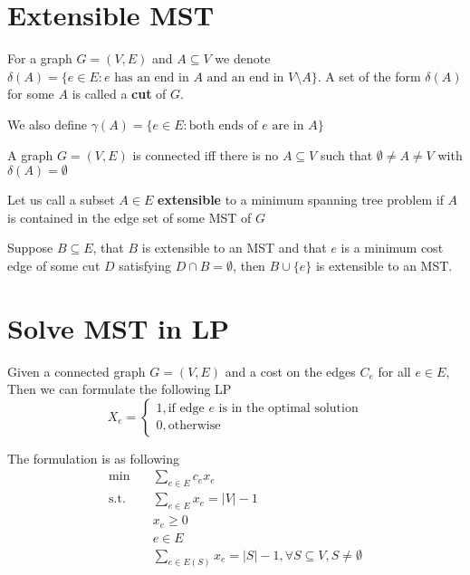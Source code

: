 		\section{Extensible MST}
			\begin{definition}[cut]
				For a graph $G=(V, E)$ and $A \subseteq V$ we denote $\delta(A) = \{e \in E :\text{$e$ has an end in $A$ and an end in $V\setminus A$}\}$. A set of the form $\delta(A)$ for some $A$ is called a \textbf{cut} of $G$.
			\end{definition}

			\begin{definition}
				We also define $\gamma(A) = \{e\in E: \text{both ends of $e$ are in $A$}\}$				
			\end{definition}

			\begin{theorem}
				A graph $G=(V, E)$ is connected iff there is no $A\subseteq V$ such that $\emptyset \ne A \ne V$ with $\delta(A) = \emptyset$
			\end{theorem}

			\begin{definition}
				Let us call a subset $A \in E$ \textbf{extensible} to a minimum spanning tree problem if $A$ is contained in the edge set of some MST of $G$
			\end{definition}

			\begin{theorem}
				Suppose $B \subseteq E$, that $B$ is extensible to an MST and that $e$ is a minimum cost edge of some cut $D$ satisfying $D\cap B = \emptyset$, then $B\cup \{e\}$ is extensible to an MST.
			\end{theorem}

		\section{Solve MST in LP}
			Given a connected graph $G=(V, E)$ and a cost on the edges $C_e$ for all $e\in E$, Then we can formulate the following LP
			\begin{equation}
				X_e = \begin{cases}
					1, \text{if edge $e$ is in the optimal solution} \\
					0, \text{otherwise}
				\end{cases}
			\end{equation}

			The formulation is as following
			\begin{align}
				\min \quad & \sum_{e\in E} c_ex_e \\
				\text{s.t.} \quad & \sum_{e\in E} x_e = |V| - 1 \\
				                  & x_e \ge 0\\
				                  & e\in E \\
				                  & \sum_{e\in E(S)} x_e = |S| - 1, \forall S\subseteq V, S\ne \emptyset \\
			\end{align}

